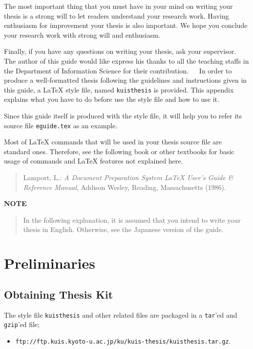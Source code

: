 \documentclass[master,english]{kuisthesis}
\def\|{\verb|}
\begin{document}
The most important thing that you must have in your mind on writing your
thesis is a strong will to let readers understand your research work.
Having enthusiasm for improvement your thesis is also important.  We hope
you conclude your research work with strong will and enthusiasm.

Finally, if you have any questions on writing your thesis, ask your
supervisor.

\acknowledgments				% Acknowledgments
The author of this guide would like express his thanks to all the teaching
staffs in the Department of Information Science for their
contribution.

\nocite{*}
			% BibTeX style
				% Output references

						% Here an appendix starts
In order to produce a well-formatted thesis following the guidelines and
instructions given in this guide, a \LaTeX{} style file, named \|kuisthesis|
is provided.  This appendix explains what you have to do before use the style
file and how to use it.

Since this guide itself is produced with the style file, it will help you to
refer its source file \verb|eguide.tex| as an example.

Most of \LaTeX{} commands that will be used in your thesis source file are
standard ones.  Therefore, see the following book or other textbooks for
basic usage of commands and \LaTeX{} features not explained here.
\begin{quote}%
Lamport, L.: {\em A Document Preparation System {\LaTeX} User's Guide \&
Reference Manual\/}, Addison Wesley, Reading, Massachusetts (1986).
\end{quote}%

\par\bigskip\centerline{\bf NOTE}
\begin{quote}
In the following explanation, it is assumed that you intend to write your
thesis in English.  Otherwise, see the Japanese version of the guide.
\end{quote}

\section{Preliminaries}\label{app-prelim}
\subsection{Obtaining Thesis Kit}\label{appsub-kit}
The style file \|kuisthesis| and other related files are packaged in a
\|tar|'ed and \|gzip|'ed file;
\begin{itemize}\item[]\small%
\|ftp://ftp.kuis.kyoto-u.ac.jp/ku/kuis-thesis/kuisthesis.tar.gz|\quad.
\end{itemize}%
\end{document}
